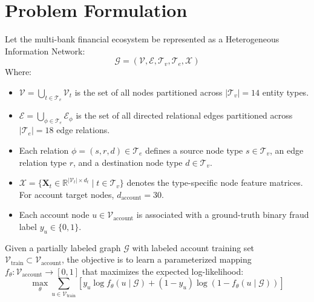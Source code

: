 \documentclass[conference]{IEEEtran}
\begin{document}
\section{Problem Formulation}
Let the multi-bank financial ecosystem be represented as a Heterogeneous Information Network:
\begin{equation}
\mathcal{G} = (\mathcal{V}, \mathcal{E}, \mathcal{T}_v, \mathcal{T}_e, \mathcal{X})
\label{eq:graph_def}
\end{equation}
Where:
\begin{itemize}
    \item $\mathcal{V} = \bigcup_{t \in \mathcal{T}_v} \mathcal{V}_t$ is the set of all nodes partitioned across $|\mathcal{T}_v| = 14$ entity types.
    \item $\mathcal{E} = \bigcup_{\phi \in \mathcal{T}_e} \mathcal{E}_\phi$ is the set of all directed relational edges partitioned across $|\mathcal{T}_e| = 18$ edge relations.
    \item Each relation $\phi = (s, r, d) \in \mathcal{T}_e$ defines a source node type $s \in \mathcal{T}_v$, an edge relation type $r$, and a destination node type $d \in \mathcal{T}_v$.
    \item $\mathcal{X} = \{\mathbf{X}_t \in \mathbb{R}^{|\mathcal{V}_t| \times d_t} \mid t \in \mathcal{T}_v\}$ denotes the type-specific node feature matrices. For account target nodes, $d_{\text{account}} = 30$.
    \item Each account node $u \in \mathcal{V}_{\text{account}}$ is associated with a ground-truth binary fraud label $y_u \in \{0, 1\}$.
\end{itemize}

Given a partially labeled graph $\mathcal{G}$ with labeled account training set $\mathcal{V}_{\text{train}} \subset \mathcal{V}_{\text{account}}$, the objective is to learn a parameterized mapping $f_\theta: \mathcal{V}_{\text{account}} \to [0, 1]$ that maximizes the expected log-likelihood:
\begin{equation}
\max_\theta \sum_{u \in \mathcal{V}_{\text{train}}} \left[ y_u \log f_\theta(u \mid \mathcal{G}) + (1 - y_u) \log (1 - f_\theta(u \mid \mathcal{G})) \right]
\label{eq:objective}
\end{equation}
\end{document}
